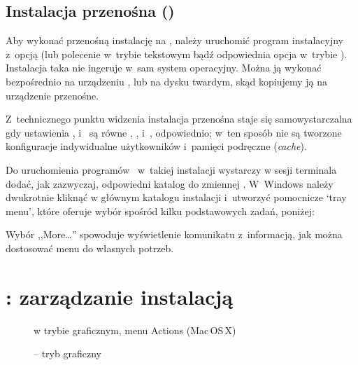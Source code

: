 \documentclass{article}
\begin{document}
\subsection{Instalacja przenośna (\USB{})}
\label{sec:portable-tl}

Aby wykonać przenośną instalację na \USB{}, należy uruchomić program
instalacyjny z~opcją  (lub polecenie  w~trybie
tekstowym bądź odpowiednia opcja w~trybie \GUI). Instalacja taka nie ingeruje
w~sam system operacyjny. Można ją wykonać bezpośrednio na urządzeniu \USB{}, lub na
dysku twardym, skąd kopiujemy ją na urządzenie przenośne.

Z~technicznego punktu widzenia instalacja przenośna staje się samowystarczalna
gdy ustawienia , 
i~ są równe ,
, i~, odpowiednio; w~ten sposób nie są tworzone
konfiguracje indywidualne użytkowników i~pamięci podręczne (\textit{cache}).

Do uruchomienia programów \TL\ w~takiej instalacji wystarczy w sesji
terminala dodać, jak zazwyczaj, odpowiedni katalog do zmiennej
.
\newpage %
W~Windows należy dwukrotnie kliknąć
 w głównym katalogu instalacji i~utworzyć
pomocnicze `tray menu', które oferuje wybór spośród kilku podstawowych
zadań, poniżej:

\medskip
{}
\smallskip
\noindent Wybór ,,More\ldots'' spowoduje wyświetlenie komunikatu z~informacją, jak można
dostosować menu do własnych potrzeb.

\section{: zarządzanie instalacją}
\label{sec:tlmgr}

\begin{figure}[tb]
\caption{ w trybie graficznym, menu Actions (Mac\,OS\,X{})}
\label{fig:tlshell}
\end{figure}

\begin{figure}[tb]
\caption{ -- tryb graficzny }
\label{fig:tlcockpit}
\end{figure}
\end{document}
